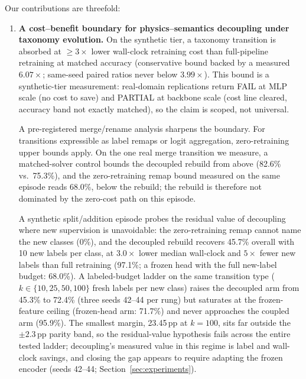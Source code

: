 Our contributions are threefold:
\begin{enumerate}
\item \textbf{A cost--benefit boundary for physics--semantics decoupling under taxonomy evolution.} On the synthetic tier, a taxonomy transition is absorbed at $\geq 3\times$ lower wall-clock retraining cost than full-pipeline retraining at matched accuracy (conservative bound backed by a measured $6.07\times$; same-seed paired ratios never below $3.99\times$). This bound is a synthetic-tier measurement: real-domain replications return FAIL at MLP scale (no cost to save) and PARTIAL at backbone scale (cost line cleared, accuracy band not exactly matched), so the claim is scoped, not universal.

A pre-registered merge/rename analysis sharpens the boundary. For transitions expressible as label remaps or logit aggregation, zero-retraining upper bounds apply. On the one real merge transition we measure, a matched-solver control bounds the decoupled rebuild from above (82.6\% vs.\ 75.3\%), and the zero-retraining remap bound measured on the same episode reads 68.0\%, below the rebuild; the rebuild is therefore not dominated by the zero-cost path on this episode.

A synthetic split/addition episode probes the residual value of decoupling where new supervision is unavoidable: the zero-retraining remap cannot name the new classes (0\%), and the decoupled rebuild recovers 45.7\% overall with 10 new labels per class, at $3.0\times$ lower median wall-clock and $5\times$ fewer new labels than full retraining (97.1\%; a frozen head with the full new-label budget: 68.0\%). A labeled-budget ladder on the same transition type ($k\in\{10,25,50,100\}$ fresh labels per new class) raises the decoupled arm from 45.3\% to 72.4\% (three seeds 42--44 per rung) but saturates at the frozen-feature ceiling (frozen-head arm: 71.7\%) and never approaches the coupled arm (95.9\%). The smallest margin, 23.45\,pp at $k{=}100$, sits far outside the $\pm2.3$\,pp parity band, so the residual-value hypothesis fails across the entire tested ladder; decoupling's measured value in this regime is label and wall-clock savings, and closing the gap appears to require adapting the frozen encoder (seeds 42--44; Section~\ref{sec:experiments}).


\end{enumerate}
